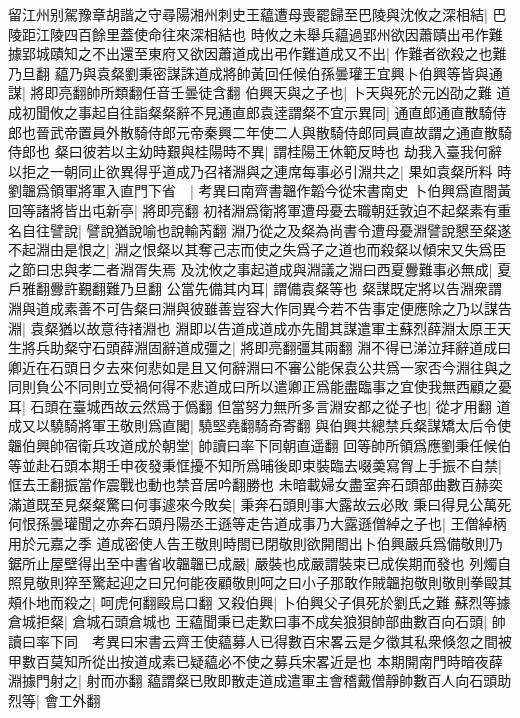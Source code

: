 留江州别駕豫章胡諧之守尋陽湘州刺史王藴遭母喪罷歸至巴陵與沈攸之深相結|{
	巴陵距江陵四百餘里蓋使命往來深相結也}
時攸之未舉兵藴過郢州欲因蕭賾出弔作難據郢城賾知之不出還至東府又欲因蕭道成出弔作難道成又不出|{
	作難者欲殺之也難乃旦翻}
藴乃與袁粲劉秉密謀誅道成將帥黃回任候伯孫曇瓘王宜興卜伯興等皆與通謀|{
	將即亮翻帥所類翻任音壬曇徒含翻}
伯興天與之子也|{
	卜天與死於元凶劭之難}
道成初聞攸之事起自往詣粲粲辭不見通直郎袁逹謂粲不宜示異同|{
	通直郎通直散騎侍郎也晉武帝置員外散騎侍郎元帝秦興二年使二人與散騎侍郎同員直故謂之通直散騎侍郎也}
粲曰彼若以主幼時艱與桂陽時不異|{
	謂桂陽王休範反時也}
劫我入臺我何辭以拒之一朝同止欲異得乎道成乃召禇淵與之連席每事必引淵共之|{
	果如袁粲所料}
時劉韞爲領軍將軍入直門下省　|{
	考異曰南齊書韞作韜今從宋書南史}
卜伯興爲直閤黃回等諸將皆出屯新亭|{
	將即亮翻}
初禇淵爲衛將軍遭母憂去職朝廷敦迫不起粲素有重名自往譬說|{
	譬說猶說喻也說輸芮翻}
淵乃從之及粲為尚書令遭母憂淵譬說懇至粲遂不起淵由是恨之|{
	淵之恨粲以其奪己志而使之失爲子之道也而殺粲以傾宋又失爲臣之節曰忠與孝二者淵胥失焉}
及沈攸之事起道成與淵議之淵曰西夏釁難事必無成|{
	夏戶雅翻釁許覲翻難乃旦翻}
公當先備其内耳|{
	謂備袁粲等也}
粲謀既定將以告淵衆謂淵與道成素善不可告粲曰淵與彼雖善豈容大作同異今若不告事定便應除之乃以謀告淵|{
	袁粲猶以故意待禇淵也}
淵即以告道成道成亦先聞其謀遣軍主蘇烈薛淵太原王天生將兵助粲守石頭薛淵固辭道成彊之|{
	將即亮翻彊其兩翻}
淵不得已涕泣拜辭道成曰卿近在石頭日夕去來何悲如是且又何辭淵曰不審公能保袁公共爲一家否今淵往與之同則負公不同則立受禍何得不悲道成曰所以遣卿正爲能盡臨事之宜使我無西顧之憂耳|{
	石頭在臺城西故云然爲于僞翻}
但當努力無所多言淵安都之從子也|{
	從才用翻}
道成又以驍騎將軍王敬則爲直閣|{
	驍堅堯翻騎奇寄翻}
與伯興共總禁兵粲謀矯太后令使韞伯興帥宿衛兵攻道成於朝堂|{
	帥讀曰率下同朝直遥翻}
回等帥所領爲應劉秉任候伯等並赴石頭本期壬申夜發秉恇擾不知所爲晡後即束裝臨去啜羮寫胷上手振不自禁|{
	恇去王翻振當作震戰也動也禁音居吟翻勝也}
未暗載婦女盡室奔石頭部曲數百赫奕滿道既至見粲粲驚曰何事遽來今敗矣|{
	秉奔石頭則事大露故云必敗}
秉曰得見公萬死何恨孫曇瓘聞之亦奔石頭丹陽丞王遜等走告道成事乃大露遜僧綽之子也|{
	王僧綽柄用於元嘉之季}
道成密使人告王敬則時閤已閉敬則欲開閤出卜伯興嚴兵爲備敬則乃鋸所止屋壁得出至中書省收韞韞已成嚴|{
	嚴裝也成嚴謂裝束已成俟期而發也}
列燭自照見敬則猝至驚起迎之曰兄何能夜顧敬則呵之曰小子那敢作賊韞抱敬則敬則拳毆其頰仆地而殺之|{
	呵虎何翻毆烏口翻}
又殺伯興|{
	卜伯興父子俱死於劉氏之難}
蘇烈等據倉城拒粲|{
	倉城石頭倉城也}
王藴聞秉已走歎曰事不成矣狼狽帥部曲數百向石頭|{
	帥讀曰率下同　考異曰宋書云齊王使藴募人已得數百宋畧云是夕徵其私衆倏忽之間被甲數百莫知所從出按道成素已疑藴必不使之募兵宋畧近是也}
本期開南門時暗夜薛淵據門射之|{
	射而亦翻}
藴謂粲已敗即散走道成遣軍主會稽戴僧靜帥數百人向石頭助烈等|{
	會工外翻}
